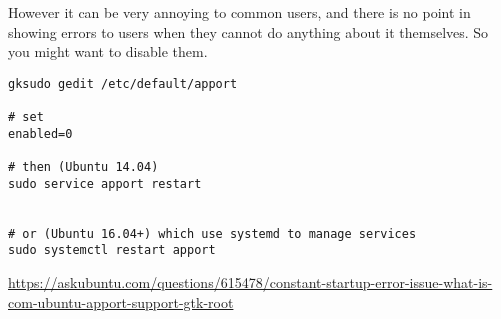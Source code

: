 However it can be very annoying to common users, and there is no point in
showing errors to users when they cannot do anything about it themselves. So you
might want to disable them.


\begin{verbatim}
gksudo gedit /etc/default/apport

# set 
enabled=0

# then (Ubuntu 14.04)
sudo service apport restart


# or (Ubuntu 16.04+) which use systemd to manage services
sudo systemctl restart apport
\end{verbatim}
\url{https://askubuntu.com/questions/615478/constant-startup-error-issue-what-is-com-ubuntu-apport-support-gtk-root}